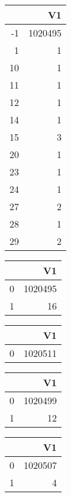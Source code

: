 \bigskip\bigskip
\centering
\begin{tabular}{rr}
  \hline
 & V1 \\ 
  \hline
-1 & 1020495 \\ 
  1 &   1 \\ 
  10 &   1 \\ 
  11 &   1 \\ 
  12 &   1 \\ 
  14 &   1 \\ 
  15 &   3 \\ 
  20 &   1 \\ 
  23 &   1 \\ 
  24 &   1 \\ 
  27 &   2 \\ 
  28 &   1 \\ 
  29 &   2 \\ 
   \hline
\end{tabular}

\bigskip\bigskip
\centering
\begin{tabular}{rr}
  \hline
 & V1 \\ 
  \hline
0 & 1020495 \\ 
  1 &  16 \\ 
   \hline
\end{tabular}

\bigskip\bigskip
\centering
\begin{tabular}{rr}
  \hline
 & V1 \\ 
  \hline
0 & 1020511 \\ 
   \hline
\end{tabular}

\bigskip\bigskip
\centering
\begin{tabular}{rr}
  \hline
 & V1 \\ 
  \hline
0 & 1020499 \\ 
  1 &  12 \\ 
   \hline
\end{tabular}

\bigskip\bigskip
\centering
\begin{tabular}{rr}
  \hline
 & V1 \\ 
  \hline
0 & 1020507 \\ 
  1 &   4 \\ 
   \hline
\end{tabular}

